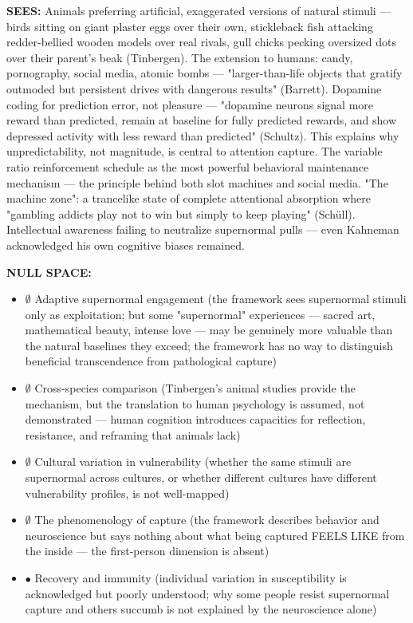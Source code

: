\textbf{SEES:} Animals preferring artificial, exaggerated versions of natural stimuli — birds sitting on giant plaster eggs over their own, stickleback fish attacking redder-bellied wooden models over real rivals, gull chicks pecking oversized dots over their parent's beak (Tinbergen). The extension to humans: candy, pornography, social media, atomic bombs — "larger-than-life objects that gratify outmoded but persistent drives with dangerous results" (Barrett). Dopamine coding for prediction error, not pleasure — "dopamine neurons signal more reward than predicted, remain at baseline for fully predicted rewards, and show depressed activity with less reward than predicted" (Schultz). This explains why unpredictability, not magnitude, is central to attention capture. The variable ratio reinforcement schedule as the most powerful behavioral maintenance mechanism — the principle behind both slot machines and social media. "The machine zone": a trancelike state of complete attentional absorption where "gambling addicts play not to win but simply to keep playing" (Schüll). Intellectual awareness failing to neutralize supernormal pulls — even Kahneman acknowledged his own cognitive biases remained.


\textbf{NULL SPACE:}

\begin{itemize}[nosep,leftmargin=*]
  \item $\emptyset$ Adaptive supernormal engagement (the framework sees supernormal stimuli only as exploitation; but some "supernormal" experiences — sacred art, mathematical beauty, intense love — may be genuinely more valuable than the natural baselines they exceed; the framework has no way to distinguish beneficial transcendence from pathological capture)
  \item $\emptyset$ Cross-species comparison (Tinbergen's animal studies provide the mechanism, but the translation to human psychology is assumed, not demonstrated — human cognition introduces capacities for reflection, resistance, and reframing that animals lack)
  \item $\emptyset$ Cultural variation in vulnerability (whether the same stimuli are supernormal across cultures, or whether different cultures have different vulnerability profiles, is not well-mapped)
  \item $\emptyset$ The phenomenology of capture (the framework describes behavior and neuroscience but says nothing about what being captured FEELS LIKE from the inside — the first-person dimension is absent)
  \item $\bullet$ Recovery and immunity (individual variation in susceptibility is acknowledged but poorly understood; why some people resist supernormal capture and others succumb is not explained by the neuroscience alone)
\end{itemize}


